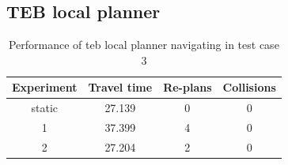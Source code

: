 \subsection{TEB local planner}%
\label{sub:eval_teb_local_planner_tc3}

\begin{table}[H]
    \centering
    \begin{tabular}{cccc}
        \textbf{Experiment} & \textbf{Travel time} & \textbf{Re-plans} & \textbf{Collisions} \\\toprule
        static & 27.139 & 0 & 0 \\
             1 & 37.399 & 4 & 0 \\
             2 & 27.204 & 2 & 0 \\
    \end{tabular}
    \caption{Performance of teb local planner navigating in test case 3}\label{tab:perfomance_teb_test_case_3}
\end{table}

